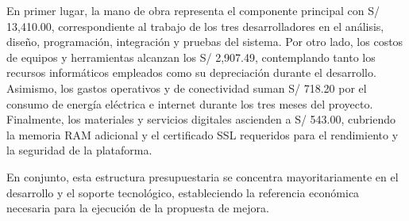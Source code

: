 \indent En primer lugar, la mano de obra representa el componente principal con S/ 13,410.00, correspondiente al trabajo de los tres desarrolladores en el análisis, diseño, programación, integración y pruebas del sistema. Por otro lado, los costos de equipos y herramientas alcanzan los S/ 2,907.49, contemplando tanto los recursos informáticos empleados como su depreciación durante el desarrollo. Asimismo, los gastos operativos y de conectividad suman S/ 718.20 por el consumo de energía eléctrica e internet durante los tres meses del proyecto. Finalmente, los materiales y servicios digitales ascienden a S/ 543.00, cubriendo la memoria RAM adicional y el certificado SSL requeridos para el rendimiento y la seguridad de la plataforma.

\indent En conjunto, esta estructura presupuestaria se concentra mayoritariamente en el desarrollo y el soporte tecnológico, estableciendo la referencia económica necesaria para la ejecución de la propuesta de mejora.
